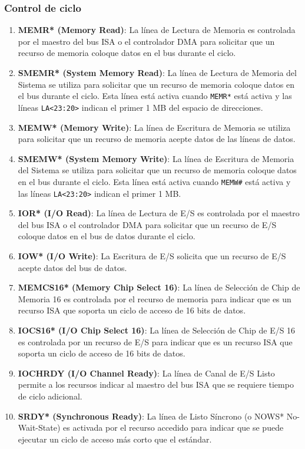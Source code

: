 \documentclass[12pt]{article}
\begin{document}
	\subsubsection*{Control de ciclo}
	\begin{enumerate}
		\item \textbf{MEMR* (Memory Read)}: La línea de Lectura de Memoria es controlada por el maestro del bus ISA o el controlador DMA para solicitar que un recurso de memoria coloque datos en el bus durante el ciclo.
		
		\item \textbf{SMEMR* (System Memory Read)}: La línea de Lectura de Memoria del Sistema se utiliza para solicitar que un recurso de memoria coloque datos en el bus durante el ciclo. Esta línea está activa cuando \texttt{MEMR*} está activa y las líneas \texttt{LA<23:20>} indican el primer 1 MB del espacio de direcciones.
		
		\item \textbf{MEMW* (Memory Write)}: La línea de Escritura de Memoria se utiliza para solicitar que un recurso de memoria acepte datos de las líneas de datos.
		
		\item \textbf{SMEMW* (System Memory Write)}: La línea de Escritura de Memoria del Sistema se utiliza para solicitar que un recurso de memoria coloque datos en el bus durante el ciclo. Esta línea está activa cuando \texttt{MEMW\#} está activa y las líneas \texttt{LA<23:20>} indican el primer 1 MB.
		
		\item \textbf{IOR* (I/O Read)}: La línea de Lectura de E/S es controlada por el maestro del bus ISA o el controlador DMA para solicitar que un recurso de E/S coloque datos en el bus de datos durante el ciclo.
		
		\item \textbf{IOW* (I/O Write)}: La Escritura de E/S solicita que un recurso de E/S acepte datos del bus de datos.
		
		\item \textbf{MEMCS16* (Memory Chip Select 16)}: La línea de Selección de Chip de Memoria 16 es controlada por el recurso de memoria para indicar que es un recurso ISA que soporta un ciclo de acceso de 16 bits de datos.
		
		\item \textbf{IOCS16* (I/O Chip Select 16)}: La línea de Selección de Chip de E/S 16 es controlada por un recurso de E/S para indicar que es un recurso ISA que soporta un ciclo de acceso de 16 bits de datos.
		
		\item \textbf{IOCHRDY (I/O Channel Ready)}: La línea de Canal de E/S Listo permite a los recursos indicar al maestro del bus ISA que se requiere tiempo de ciclo adicional.
		
		\item \textbf{SRDY* (Synchronous Ready)}: La línea de Listo Síncrono (o NOWS* No-Wait-State) es activada por el recurso accedido para indicar que se puede ejecutar un ciclo de acceso más corto que el estándar.
	\end{enumerate}
	
\end{document}
